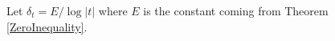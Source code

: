 \begin{definition}[DeltaT]
\label{DeltaT}
\leanok
Let $\delta_t=E/\log|t|$ where $E$ is the constant coming from Theorem \ref{ZeroInequality}.
\end{definition}
